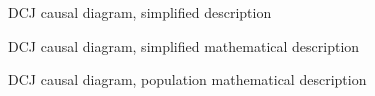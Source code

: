 \documentclass[
  authoryear,
  preprint,
  1p]{elsarticle}
\begin{document}
\begin{figure}


\caption{\label{fig-SciModel_simp1}DCJ causal diagram, simplified
description}

\end{figure}%

\begin{figure}


\caption{\label{fig-SciModel_simp2}DCJ causal diagram, simplified
mathematical description}

\end{figure}%

\begin{figure}


\caption{\label{fig-SciModel_pop}DCJ causal diagram, population
mathematical description}

\end{figure}%
\end{document}
